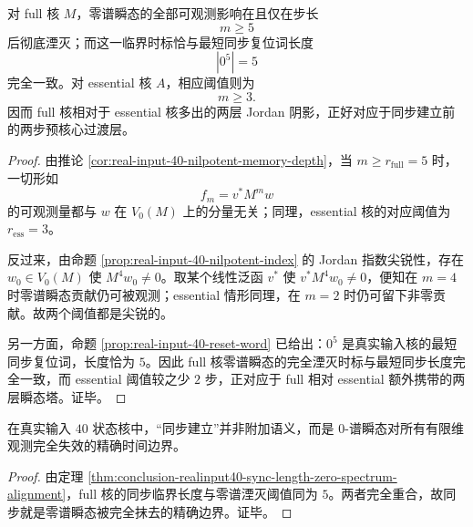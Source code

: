 \begin{theorem}[同步长度与零谱湮灭时标的完全对齐]\label{thm:conclusion-realinput40-sync-length-zero-spectrum-alignment}
对 full 核 \(M\)，零谱瞬态的全部可观测影响在且仅在步长
\[
m\ge 5
\]
后彻底湮灭；而这一临界时标恰与最短同步复位词长度
\[
|0^5|=5
\]
完全一致。对 essential 核 \(A\)，相应阈值则为
\[
m\ge 3.
\]
因而 full 核相对于 essential 核多出的两层 Jordan 阴影，正好对应于同步建立前的两步预核心过渡层。
\end{theorem}
\begin{proof}
由推论 \ref{cor:real-input-40-nilpotent-memory-depth}，当 \(m\ge r_{\mathrm{full}}=5\) 时，一切形如
\[
f_m=v^\ast M^m w
\]
的可观测量都与 \(w\) 在 \(V_0(M)\) 上的分量无关；同理，essential 核的对应阈值为 \(r_{\mathrm{ess}}=3\)。

反过来，由命题 \ref{prop:real-input-40-nilpotent-index} 的 Jordan 指数尖锐性，存在 \(w_0\in V_0(M)\) 使 \(M^4w_0\neq 0\)。取某个线性泛函 \(v^\ast\) 使 \(v^\ast M^4w_0\neq 0\)，便知在 \(m=4\) 时零谱瞬态贡献仍可被观测；essential 情形同理，在 \(m=2\) 时仍可留下非零贡献。故两个阈值都是尖锐的。

另一方面，命题 \ref{prop:real-input-40-reset-word} 已给出：\(0^5\) 是真实输入核的最短同步复位词，长度恰为 \(5\)。因此 full 核零谱瞬态的完全湮灭时标与最短同步长度完全一致，而 essential 阈值较之少 \(2\) 步，正对应于 full 相对 essential 额外携带的两层瞬态塔。证毕。
\end{proof}

\begin{corollary}[同步是零谱瞬态被完全抹去的精确时间边界]\label{cor:conclusion-realinput40-sync-exact-zero-spectrum-boundary}
在真实输入 \(40\) 状态核中，“同步建立”并非附加语义，而是 \(0\)-谱瞬态对所有有限维观测完全失效的精确时间边界。
\end{corollary}
\begin{proof}
由定理 \ref{thm:conclusion-realinput40-sync-length-zero-spectrum-alignment}，full 核的同步临界长度与零谱湮灭阈值同为 \(5\)。两者完全重合，故同步就是零谱瞬态被完全抹去的精确边界。证毕。
\end{proof}

